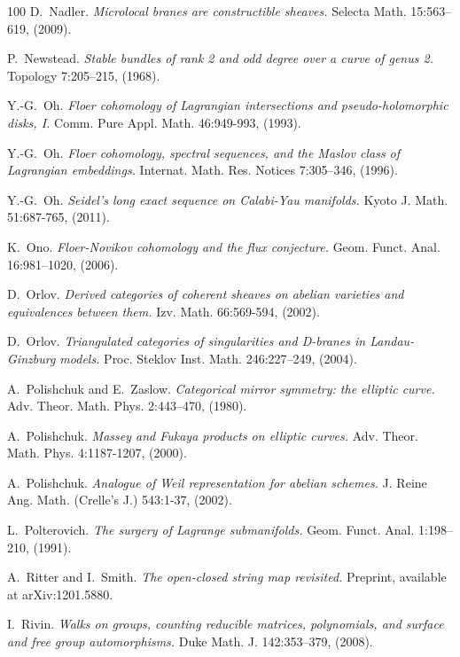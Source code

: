 \documentclass[11pt,a4paper]{article}
\numberwithin{equation}{section}
\begin{document}
\begin{thebibliography}{100}
D.~Nadler.
\emph{Microlocal branes are constructible sheaves.}
Selecta Math. 15:563--619, (2009).

P.~Newstead.
\emph{Stable bundles of rank 2 and odd degree over a curve of genus 2.}
Topology 7:205--215, (1968).

Y.-G.~Oh.
\emph{Floer cohomology of Lagrangian intersections and pseudo-holomorphic disks, I.}
Comm. Pure Appl. Math. 46:949-993, (1993).

Y.-G.~Oh.
\emph{Floer cohomology, spectral sequences, and the Maslov class of Lagrangian embeddings.}
Internat. Math. Res. Notices 7:305--346, (1996).

Y.-G.~Oh.
\emph{Seidel's long exact sequence on Calabi-Yau manifolds.}
Kyoto J. Math. 51:687-765, (2011).

K.~Ono.
\emph{Floer-Novikov cohomology and the flux conjecture.}
Geom. Funct. Anal. 16:981--1020, (2006).

D.~Orlov.
\emph{Derived categories of coherent sheaves on abelian varieties and equivalences between them.}
Izv. Math. 66:569-594, (2002).

D.~Orlov.
\emph{Triangulated categories of singularities and D-branes in Landau-Ginzburg models.}
Proc. Steklov Inst. Math. 246:227--249, (2004).

A.~Polishchuk and E.~Zaslow.
\emph{Categorical mirror symmetry: the elliptic curve.}
Adv. Theor. Math. Phys. 2:443--470, (1980).

A.~Polishchuk.
\emph{Massey and Fukaya products on elliptic curves.}
Adv. Theor. Math. Phys. 4:1187-1207, (2000).

A.~Polishchuk.
\emph{Analogue of Weil representation for abelian schemes.}
J. Reine Ang. Math. (Crelle's J.) 543:1-37, (2002).

L.~Polterovich.
\emph{The surgery of Lagrange submanifolds.}
 Geom. Funct. Anal. 1:198--210, (1991).


A.~Ritter and I.~Smith.
\emph{The open-closed string map revisited.}
Preprint, available at arXiv:1201.5880.

I.~Rivin.
\emph{Walks on groups, counting reducible matrices, polynomials, and surface and free group automorphisms.}
Duke Math. J. 142:353--379, (2008).


\end{thebibliography}
\end{document}

